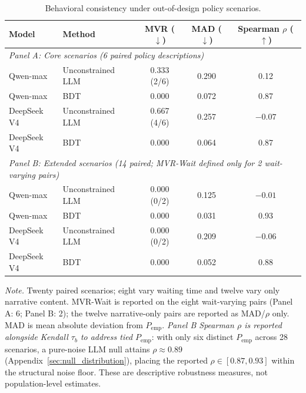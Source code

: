 \documentclass[11pt]{article}
\begin{document}
\begin{table}[t]
\centering
\caption{Behavioral consistency under out-of-design policy scenarios.}
\label{tab:out_of_design}
\small
\setlength{\tabcolsep}{4pt}
\begin{tabular}{@{}llccc@{}}
\toprule
Model & Method & MVR ($\downarrow$) & MAD ($\downarrow$) & Spearman $\rho$ ($\uparrow$)\\
\midrule

\multicolumn{5}{l}{\textit{Panel A: Core scenarios (6 paired policy descriptions)}}\\

Qwen-max
& Unconstrained LLM
& 0.333 (2/6)
& 0.290
& 0.12 \\

Qwen-max
& BDT
& 0.000
& 0.072
& 0.87 \\

DeepSeek V4
& Unconstrained LLM
& 0.667 (4/6)
& 0.257
& $-0.07$ \\

DeepSeek V4
& BDT
& 0.000
& 0.064
& 0.87 \\

\midrule

\multicolumn{5}{l}{\textit{Panel B: Extended scenarios (14 paired; MVR-Wait defined only for 2 wait-varying pairs)}}\\

Qwen-max
& Unconstrained LLM
& 0.000 (0/2)
& 0.125
& $-0.01$ \\

Qwen-max
& BDT
& 0.000
& 0.031
& 0.93 \\

DeepSeek V4
& Unconstrained LLM
& 0.000 (0/2)
& 0.209
& $-0.06$ \\

DeepSeek V4
& BDT
& 0.000
& 0.052
& 0.88 \\

\bottomrule
\end{tabular}

\vspace{0.4em}

\begin{minipage}{0.95\textwidth}
\small
\textit{Note.}
Twenty paired scenarios; eight vary waiting time and twelve vary only narrative content. MVR-Wait is reported on the eight wait-varying pairs (Panel A: 6; Panel B: 2); the twelve narrative-only pairs are reported as MAD/$\rho$ only. MAD is mean absolute deviation from $P_{\text{emp}}$. \emph{Panel B Spearman $\rho$ is reported alongside Kendall $\tau_b$ to address tied $P_{\text{emp}}$}: with only six distinct $P_{\text{emp}}$ across 28 scenarios, a pure-noise LLM null attains $\rho \approx 0.89$ (Appendix~\ref{sec:null_distribution}), placing the reported $\rho \in [0.87, 0.93]$ within the structural noise floor. These are descriptive robustness measures, not population-level estimates.
\end{minipage}
\end{table}
\end{document}
